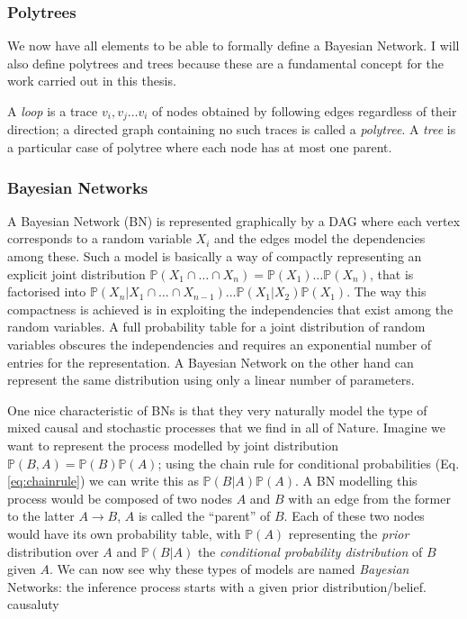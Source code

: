 \subsubsection{Polytrees}
We now have all elements to be able to formally define a Bayesian Network.
I will also define polytrees and trees because these are a fundamental concept for the work carried out in this thesis.

A \textit{loop} is a trace $v_i, v_j \ldots v_i$ of nodes obtained by following edges regardless of their direction; a directed graph containing no such traces is called a \textit{polytree}.  
A \textit{tree} is a particular case of polytree where each node has at most one parent.

\subsubsection{Bayesian Networks}
A Bayesian Network (BN) is represented graphically by a DAG where each vertex corresponds to a random variable $X_i$ and the edges model the dependencies among these.
Such a model is basically a way of compactly representing an explicit joint distribution $\mathbb{P}(X_1 \cap \ldots \cap X_n) = \mathbb{P}(X_1) \ldots \mathbb{P}(X_n)$, that is factorised into $\mathbb{P}(X_n | X_1 \cap \ldots \cap X_{n-1}) \ldots \mathbb{P}(X_1 | X_2 ) \mathbb{P}(X_1) $.
The way this compactness is achieved is in exploiting the independencies that exist among the random variables.
A full probability table for a joint distribution of random variables obscures the independencies and requires an exponential number of entries for the representation.
A Bayesian Network on the other hand can represent the same distribution using only a linear number of parameters.

One nice characteristic of BNs is that they very naturally model the type of mixed causal and stochastic processes that we find in all of Nature.
Imagine we want to represent the process modelled by joint distribution $\mathbb{P}(B,A) = \mathbb{P}(B) \mathbb{P}(A)$; using the chain rule for conditional probabilities (Eq. \ref{eq:chainrule}) we can write this as $\mathbb{P}(B|A) \mathbb{P}(A)$.
A BN modelling this process would be composed of two nodes $A$ and $B$ with an edge from the former to the latter $A \rightarrow B$, $A$ is called the ``parent'' of $B$.  Each of these two nodes would have its own probability table, with $\mathbb{P}(A)$ representing the \textit{prior} distribution over $A$ and $\mathbb{P}(B|A)$ the \textit{conditional probability distribution} of $B$ given $A$.
We can now see why these types of models are named \textit{Bayesian} Networks: the inference process starts with a given prior distribution/belief.
causaluty





